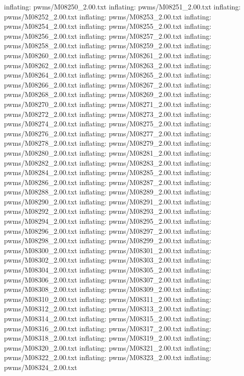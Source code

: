 \documentclass[letterpaper,10pt,english]{sphinxmanual}
\begin{document}
{\begin{sphinxVerbatim}[commandchars=\\\{\}]
  inflating: pwms/M08250\_2.00.txt
  inflating: pwms/M08251\_2.00.txt
  inflating: pwms/M08252\_2.00.txt
  inflating: pwms/M08253\_2.00.txt
  inflating: pwms/M08254\_2.00.txt
  inflating: pwms/M08255\_2.00.txt
  inflating: pwms/M08256\_2.00.txt
  inflating: pwms/M08257\_2.00.txt
  inflating: pwms/M08258\_2.00.txt
  inflating: pwms/M08259\_2.00.txt
  inflating: pwms/M08260\_2.00.txt
  inflating: pwms/M08261\_2.00.txt
  inflating: pwms/M08262\_2.00.txt
  inflating: pwms/M08263\_2.00.txt
  inflating: pwms/M08264\_2.00.txt
  inflating: pwms/M08265\_2.00.txt
  inflating: pwms/M08266\_2.00.txt
  inflating: pwms/M08267\_2.00.txt
  inflating: pwms/M08268\_2.00.txt
  inflating: pwms/M08269\_2.00.txt
  inflating: pwms/M08270\_2.00.txt
  inflating: pwms/M08271\_2.00.txt
  inflating: pwms/M08272\_2.00.txt
  inflating: pwms/M08273\_2.00.txt
  inflating: pwms/M08274\_2.00.txt
  inflating: pwms/M08275\_2.00.txt
  inflating: pwms/M08276\_2.00.txt
  inflating: pwms/M08277\_2.00.txt
  inflating: pwms/M08278\_2.00.txt
  inflating: pwms/M08279\_2.00.txt
  inflating: pwms/M08280\_2.00.txt
  inflating: pwms/M08281\_2.00.txt
  inflating: pwms/M08282\_2.00.txt
  inflating: pwms/M08283\_2.00.txt
  inflating: pwms/M08284\_2.00.txt
  inflating: pwms/M08285\_2.00.txt
  inflating: pwms/M08286\_2.00.txt
  inflating: pwms/M08287\_2.00.txt
  inflating: pwms/M08288\_2.00.txt
  inflating: pwms/M08289\_2.00.txt
  inflating: pwms/M08290\_2.00.txt
  inflating: pwms/M08291\_2.00.txt
  inflating: pwms/M08292\_2.00.txt
  inflating: pwms/M08293\_2.00.txt
  inflating: pwms/M08294\_2.00.txt
  inflating: pwms/M08295\_2.00.txt
  inflating: pwms/M08296\_2.00.txt
  inflating: pwms/M08297\_2.00.txt
  inflating: pwms/M08298\_2.00.txt
  inflating: pwms/M08299\_2.00.txt
  inflating: pwms/M08300\_2.00.txt
  inflating: pwms/M08301\_2.00.txt
  inflating: pwms/M08302\_2.00.txt
  inflating: pwms/M08303\_2.00.txt
  inflating: pwms/M08304\_2.00.txt
  inflating: pwms/M08305\_2.00.txt
  inflating: pwms/M08306\_2.00.txt
  inflating: pwms/M08307\_2.00.txt
  inflating: pwms/M08308\_2.00.txt
  inflating: pwms/M08309\_2.00.txt
  inflating: pwms/M08310\_2.00.txt
  inflating: pwms/M08311\_2.00.txt
  inflating: pwms/M08312\_2.00.txt
  inflating: pwms/M08313\_2.00.txt
  inflating: pwms/M08314\_2.00.txt
  inflating: pwms/M08315\_2.00.txt
  inflating: pwms/M08316\_2.00.txt
  inflating: pwms/M08317\_2.00.txt
  inflating: pwms/M08318\_2.00.txt
  inflating: pwms/M08319\_2.00.txt
  inflating: pwms/M08320\_2.00.txt
  inflating: pwms/M08321\_2.00.txt
  inflating: pwms/M08322\_2.00.txt
  inflating: pwms/M08323\_2.00.txt
  inflating: pwms/M08324\_2.00.txt

\end{sphinxVerbatim}}
\end{document}

